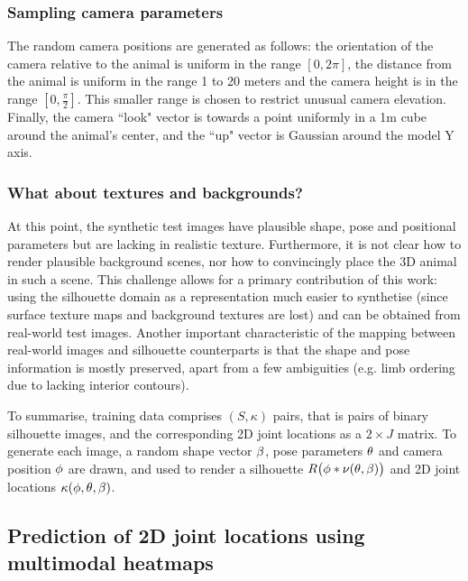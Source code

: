 \subsubsection{Sampling camera parameters}

The random camera positions are generated as follows: the orientation of the camera relative to the animal is uniform in the range $[0, 2\pi]$, the distance from the animal is uniform in the range 1 to 20 meters and the camera height is in the range $[0,\frac{\pi}{2}]$. This smaller range is chosen to restrict unusual camera elevation. Finally, the camera ``look" vector is towards a point uniformly in a 1m cube around the animal's center, and the ``up" vector is Gaussian around the model Y axis.  

\subsubsection{What about textures and backgrounds?} 

At this point, the synthetic test images have plausible shape, pose and positional parameters but are lacking in realistic texture. Furthermore, it is not clear how to render plausible background scenes, nor how to convincingly place the 3D animal in such a scene. This challenge allows for a primary contribution of this work: using the silhouette domain as a representation much easier to synthetise (since surface texture maps and background textures are lost) and can be obtained from real-world test images. Another important characteristic of the mapping between real-world images and silhouette counterparts is that the shape and pose information is mostly preserved, apart from a few ambiguities (e.g. limb ordering due to lacking interior contours). 

To summarise, training data comprises $(S, \kappa)$ pairs, that is pairs of binary silhouette images, and the corresponding 2D joint locations as a $2\times J$ matrix.  To generate each image, a random shape vector $\beta$, pose parameters $\theta$ and camera position $\phi$ are drawn, and used to render a silhouette $R\bigl(\phi * \nu(\theta, \beta)\bigr)$ and 2D joint locations $\kappa(\phi,\theta,\beta)$.


\subsection{Prediction of 2D joint locations using multimodal heatmaps}



